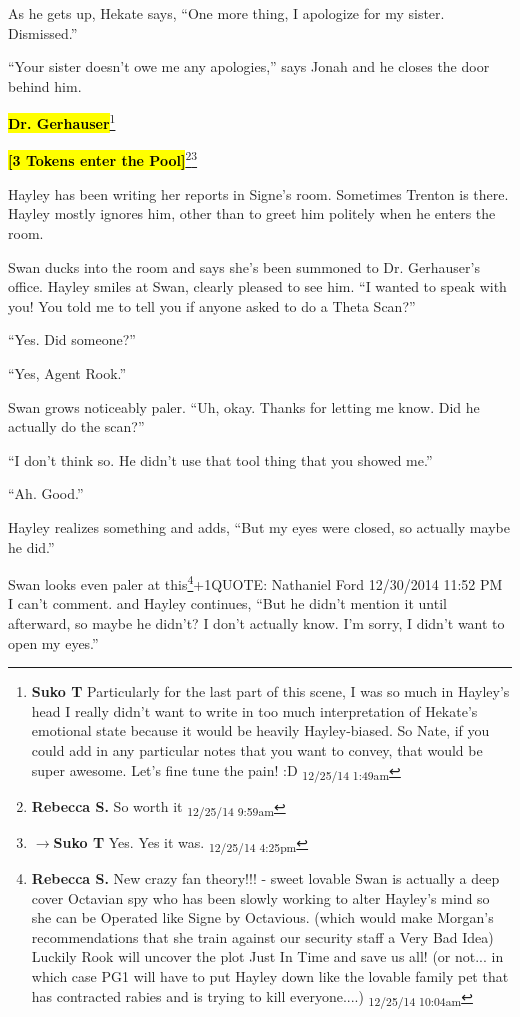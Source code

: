 As he gets up, Hekate says, ``One more thing, I apologize for my sister.  Dismissed.''

``Your sister doesn't owe me any apologies,'' says Jonah and he closes the door behind him.




\textbf{\hl{Dr. Gerhauser}}\footnote{\textbf{Suko T }Particularly for the last part of this scene, I was so much in Hayley's head I really didn't want to write in too much interpretation of Hekate's emotional state because it would be heavily Hayley-biased.  So Nate, if you could add in any particular notes that you want to convey, that would be super awesome.  Let's fine tune the pain! :D \textsubscript{12/25/14 1:49am}}

\textbf{\hl{{[}3 Tokens enter the Pool{]}}}\footnote{\textbf{Rebecca S. }So worth it \textsubscript{12/25/14 9:59am}}\footnote{$\rightarrow$\textbf{Suko T }Yes.  Yes it was. \textsubscript{12/25/14 4:25pm}}



Hayley has been writing her reports in Signe's room.  Sometimes Trenton is there.  Hayley mostly ignores him, other than to greet him politely when he enters the room.



Swan ducks into the room and says she's been summoned to Dr. Gerhauser's office.  Hayley smiles at Swan, clearly pleased to see him. ``I wanted to speak with you!  You told me to tell you if anyone asked to do a Theta Scan?''

``Yes.  Did someone?''

``Yes, Agent Rook.''

Swan grows noticeably paler.  ``Uh, okay. Thanks for letting me know.  Did he actually do the scan?''

``I don't think so.  He didn't use that tool thing that you showed me.''

``Ah.  Good.''

Hayley realizes something and adds, ``But my eyes were closed, so actually maybe he did.''

Swan looks even paler at this\footnote{\textbf{Rebecca S. }New crazy fan theory!!! - sweet lovable Swan  is actually a deep cover Octavian spy who has been slowly working to alter Hayley's mind so she can be Operated like Signe by Octavious.  (which would make Morgan's recommendations that she train against our security staff a Very Bad Idea)  Luckily Rook will uncover the plot Just In Time and save us all!  (or not... in which case PG1 will have to put Hayley down like the lovable family pet that has contracted rabies and is trying to kill everyone....) \textsubscript{12/25/14 10:04am}}+1QUOTE: Nathaniel Ford        12/30/2014 11:52 PM
I can't comment. and Hayley continues, ``But he didn't mention it until afterward, so maybe he didn't?  I don't actually know.  I'm sorry, I didn't want to open my eyes.''

